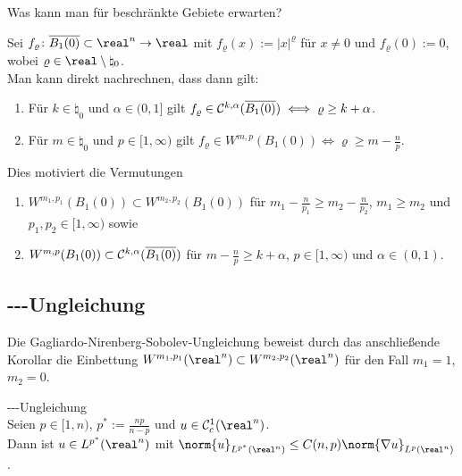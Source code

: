 \begin{Bem}
    Was kann man für beschränkte Gebiete erwarten?

    Sei $f_\varrho\colon \overline{B_1(0)} \subset \real^n \to \real$ mit
    $f_\varrho(x) := |x|^\varrho$ für $x \not= 0$ und $f_\varrho(0) := 0$,
    wobei $\varrho \in \real \setminus \natural_0$.\\
    Man kann direkt nachrechnen, dass dann gilt:
    \begin{enumerate}
        \item
        Für $k \in \natural_0$ und $\alpha \in (0, 1]$ gilt
        $f_\varrho \in \mathcal{C}^{k,\alpha}(\overline{B_1(0)}) \iff \varrho \ge k + \alpha$.

        \item
        Für $m \in \natural_0$ und $p \in [1, \infty)$ gilt
        $f_\varrho \in W^{m,p}(B_1(0)) \iff \varrho \ge m - \frac{n}{p}$.
    \end{enumerate}
    Dies motiviert die Vermutungen
    \begin{enumerate}
        \item
        $W^{m_1,p_1}(B_1(0)) \subset W^{m_2,p_2}(B_1(0))$ für
        $m_1 - \frac{n}{p_1} \ge m_2 - \frac{n}{p_2}$, $m_1 \ge m_2$ und
        $p_1, p_2 \in [1, \infty)$ sowie

        \item
        $W^{m,p}(B_1(0)) \subset \mathcal{C}^{k,\alpha}(\overline{B_1(0)})$ für
        $m - \frac{n}{p} \ge k + \alpha$, $p \in [1, \infty)$ und $\alpha \in (0, 1)$.
    \end{enumerate}
\end{Bem}

\pagebreak

\subsection{%
    ---Ungleichung%
}

\begin{Bem}
    Die Gagliardo-Nirenberg-Sobolev-Ungleichung beweist durch das anschließende Korollar
    die Einbettung $W^{m_1,p_1}(\real^n) \subset W^{m_2,p_2}(\real^n)$ für den Fall
    $m_1 = 1$, $m_2 = 0$.
\end{Bem}

\begin{Satz}{---Ungleichung}\\
    Seien $p \in [1, n)$, $p^\ast := \frac{np}{n - p}$ und $u \in \C^1_c(\real^n)$.\\
    Dann ist $u \in L^{p^\ast}(\real^n)$ mit
    $\norm{u}_{L^{p^\ast}(\real^n)} \le C(n,p) \norm{\nabla u}_{L^p(\real^n)}$.
\end{Satz}

